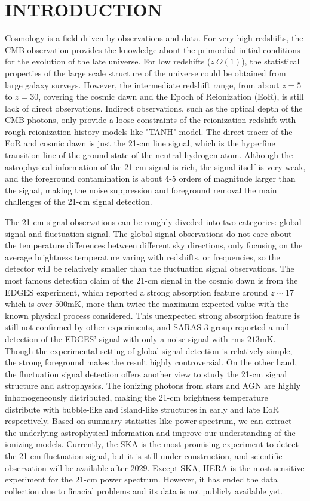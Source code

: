 \section{INTRODUCTION}
\label{sec:intro}
Cosmology is a field driven by observations and data. For very high redshifts, the CMB observation provides the knowledge about the primordial initial conditions for the evolution of the late universe. For low redshifts ($z ~ O(1)$), the statistical properties of the large scale structure of the universe could be obtained from large galaxy surveys. However, the intermediate redshift range, from about $z = 5$ to $z = 30$, covering the cosmic dawn and the Epoch of Reionization (EoR), is still lack of direct observations. Indirect observations, such as the optical depth of the CMB photons, only provide a loose constraints of the reionization redshift with rough reionization history models like "TANH" model. The direct tracer of the EoR and cosmic dawn is just the 21-cm line signal, which is the hyperfine transition line of the ground state of the neutral hydrogen atom. Although the astrophysical information of the 21-cm signal is rich, the signal itself is very weak, and the foreground contamination is about 4-5 orders of magnitude larger than the signal, making the noise suppression and foreground removal the main challenges of the 21-cm signal detection.

The 21-cm signal observations can be roughly diveded into two categories: global signal and fluctuation signal. The global signal observations do not care about the temperature differences between different sky directions, only focusing on the average brightness temperature varing with redshifts, or frequencies, so the detector will be relatively smaller than the fluctuation signal observations. The most famous detection claim of the 21-cm signal in the cosmic dawn is from the EDGES experiment, which reported a strong absorption feature around $z \sim 17$ which is over $500 \text{mK}$, more than twice the maximum expected value with the known physical process considered. This unexpected strong absorption feature is still not confirmed by other experiments, and SARAS 3 group reported a null detection of the EDGES' signal with only a noise signal with rms $213 \text{mK}$. Though the experimental setting of global signal detection is relatively simple, the strong foreground makes the result highly controversial. On the other hand, the fluctuation signal detection offers another view to study the 21-cm signal structure and astrophysics. The ionizing photons from stars and AGN are highly inhomogeneously distributed, making the 21-cm brightness temperature distribute with bubble-like and island-like structures in early and late EoR respectively. Based on summary statistics like power spectrum, we can extract the underlying astrophysical information and improve our understanding of the ionizing models. Currently, the SKA is the most promising experiment to detect the 21-cm fluctuation signal, but it is still under construction, and scientific observation will be available after 2029. Except SKA, HERA is the most sensitive experiment for the 21-cm power spectrum. However, it has ended the data collection due to finacial problems and its data is not publicly available yet. 

